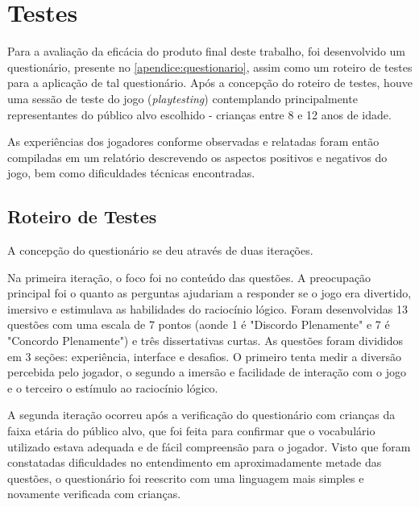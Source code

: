 
\chapter{Testes}\label{cap-testes}

Para a avaliação da eficácia do produto final deste trabalho, foi
desenvolvido um questionário, presente no \autoref{apendice:questionario}, assim como um roteiro de testes para a aplicação de tal questionário. Após a concepção do roteiro de testes, houve uma sessão de teste do jogo (\textit{playtesting}) contemplando principalmente representantes do público alvo escolhido - crianças entre 8 e 12 anos de idade.

As experiências dos jogadores conforme observadas e relatadas foram 
então compiladas em um relatório descrevendo os aspectos positivos e negativos 
do jogo, bem como dificuldades técnicas encontradas.

\section{Roteiro de Testes}\label{sec-roteiro-testes}

A concepção do questionário se deu através de duas iterações.

Na primeira iteração, o foco foi no conteúdo das questões. A preocupação principal foi o quanto as perguntas ajudariam a responder se o jogo era divertido, imersivo e estimulava as habilidades do raciocínio lógico. Foram desenvolvidas 13 questões com uma escala de 7 pontos (aonde 1 é "Discordo Plenamente" e 7 é "Concordo Plenamente") e três dissertativas curtas. As questões foram divididos em 3 seções: experiência, interface e desafios. O primeiro tenta medir a diversão percebida pelo jogador, o segundo a imersão e facilidade de interação com o jogo e o terceiro o estímulo ao raciocínio lógico.

A segunda iteração ocorreu após a verificação do questionário com crianças da faixa etária do público alvo, que foi feita para confirmar que o vocabulário utilizado estava adequada e de fácil compreensão para o jogador. Visto que foram constatadas dificuldades no entendimento em aproximadamente metade das questões, o questionário foi reescrito com uma linguagem mais simples e novamente verificada com crianças.

